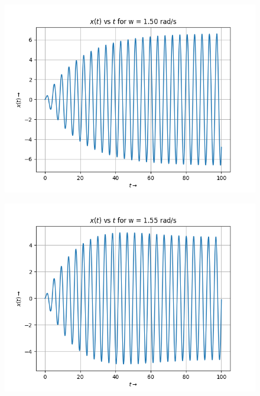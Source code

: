 \documentclass[12pt, a4paper]{article}
\begin{document}
\vspace*{-0.5cm}
\begin{figure}[H]
    \centering
    \includegraphics[scale = 0.9]{Figure_5.png}
    \label{fig:sample}
\end{figure}
\vspace*{-0.5cm}
\begin{figure}[H]
    \centering
    \includegraphics[scale = 0.9]{Figure_6.png}
    \label{fig:sample}
\end{figure}
\vspace*{-0.5cm}
\end{document}
